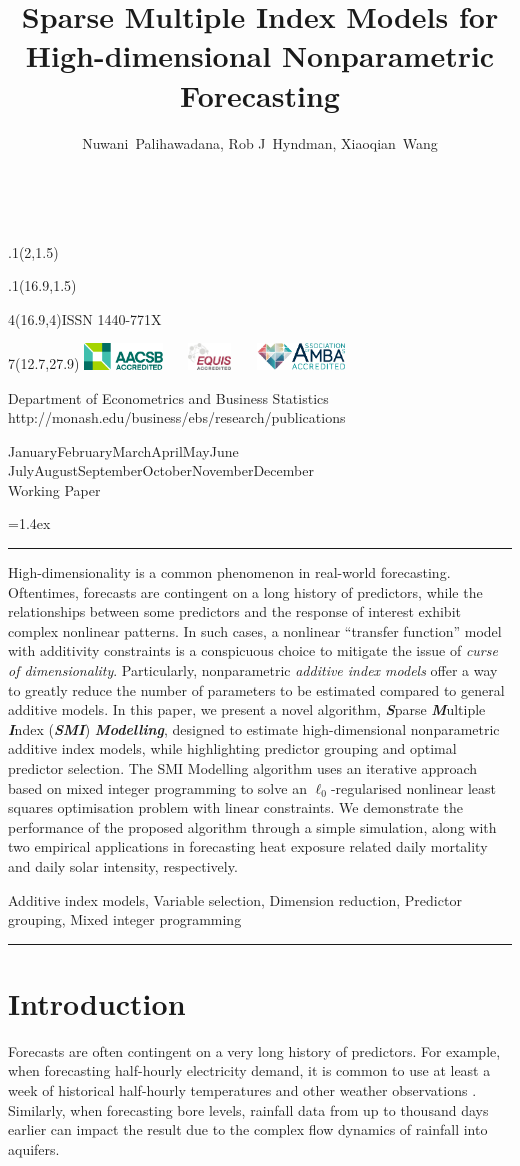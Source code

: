 \documentclass[11pt,a4paper,]{article}
\title{Sparse Multiple Index Models for High-dimensional Nonparametric
Forecasting}
\author{Nuwani~Palihawadana, Rob J~Hyndman, Xiaoqian~Wang}
\date{\sf\Date~\Month~\Year}
\makeatletter
\def\Date{\number\day}
\def\Month{\ifcase\month\or
 January\or February\or March\or April\or May\or June\or
 July\or August\or September\or October\or November\or December\fi}
\def\Year{\number\year}
\def\showjel{{\large\textsf{\textbf{JEL classification:}}~\@jel}}
\def\cover{{\sffamily\setcounter{page}{0}
        \thispagestyle{empty}
        \placefig{2}{1.5}{width=5cm}{_extensions/numbats/wp/monash2}
        \placefig{16.9}{1.5}{width=2.1cm}{_extensions/numbats/wp/MBSportrait}
        \begin{textblock}{4}(16.9,4)ISSN 1440-771X\end{textblock}
        \begin{textblock}{7}(12.7,27.9)\hfill
        \includegraphics[height=0.7cm]{_extensions/numbats/wp/AACSB}~~~
        \includegraphics[height=0.7cm]{_extensions/numbats/wp/EQUIS}~~~
        \includegraphics[height=0.7cm]{_extensions/numbats/wp/AMBA}
        \end{textblock}
        \vspace*{2cm}
        \begin{center}\Large
        Department of Econometrics and Business Statistics\\[.5cm]
        \footnotesize http://monash.edu/business/ebs/research/publications
        \end{center}\vspace{2cm}
        \begin{center}
        \fbox{\parbox{14cm}{\begin{onehalfspace}\centering\Huge\vspace*{0.3cm}
                \textsf{\textbf{\expandafter{\@title}}}\vspace{1cm}\par
                \LARGE\@author\end{onehalfspace}
        }}
        \end{center}
        \vfill
                \begin{center}\Large
                \Month~\Year\\[1cm]
                Working Paper \@wp
        \end{center}\vspace*{2cm}}}
\def\pageone{{\sffamily\setstretch{1}%
        \thispagestyle{empty}%
        \vbox to \textheight{%
        \raggedright\baselineskip=1.2cm
     {\fontsize{24.88}{30}\sffamily\textbf{\expandafter{\@title}}}
        \vspace{2cm}\par
        \hspace{1cm}\parbox{14cm}{\sffamily\large\@addresses}\vspace{1cm}\vfill
        \hspace{1cm}{\large\Date~\Month~\Year}\\[1cm]
        \hspace{1cm}\showjel\vss}}}
\def\blindtitle{{\sffamily
     \thispagestyle{plain}\raggedright\baselineskip=1.2cm
     {\fontsize{24.88}{30}\sffamily\textbf{\expandafter{\@title}}}\vspace{1cm}\par
        }}
\def\titlepage{{\cover\newpage\pageone\newpage\blindtitle}}
\let\maketitle\titlepage
\newenvironment{keywords}{\par\vspace{0.5cm}\noindent{\sffamily\textbf{Keywords:}}}{\vspace{0.25cm}\par\hrule\vspace{0.5cm}\par}
\renewenvironment{abstract}{\begin{minipage}{\textwidth}\parskip=1.4ex\noindent
\hrule\vspace{0.1cm}\par{\sffamily\textbf{\abstractname}}\newline}
  {\end{minipage}}
\def\placefig#1#2#3#4{\begin{textblock}{.1}(#1,#2)\rlap{\texttt{[image: \#4]}}\end{textblock}}
\makeatother
\begin{document}
\maketitle
\begin{abstract}
High-dimensionality is a common phenomenon in real-world forecasting.
Oftentimes, forecasts are contingent on a long history of predictors,
while the relationships between some predictors and the response of
interest exhibit complex nonlinear patterns. In such cases, a nonlinear
``transfer function'' model with additivity constraints is a conspicuous
choice to mitigate the issue of \emph{curse of dimensionality}.
Particularly, nonparametric \emph{additive index models} offer a way to
greatly reduce the number of parameters to be estimated compared to
general additive models. In this paper, we present a novel algorithm,
\textbf{\emph{S}}parse \textbf{\emph{M}}ultiple \textbf{\emph{I}}ndex
(\textbf{\emph{SMI}}) \textbf{\emph{Modelling}}, designed to estimate
high-dimensional nonparametric additive index models, while highlighting
predictor grouping and optimal predictor selection. The SMI Modelling
algorithm uses an iterative approach based on mixed integer programming
to solve an \(\ell_{0}\)-regularised nonlinear least squares
optimisation problem with linear constraints. We demonstrate the
performance of the proposed algorithm through a simple simulation, along
with two empirical applications in forecasting heat exposure related
daily mortality and daily solar intensity, respectively.
\end{abstract}
\begin{keywords}
Additive index models, Variable selection, Dimension reduction,
Predictor grouping, Mixed integer programming
\end{keywords}

\ifdefined\Shaded\renewenvironment{Shaded}{\begin{tcolorbox}[enhanced, frame hidden, boxrule=0pt, sharp corners, breakable, interior hidden, borderline west={3pt}{0pt}{shadecolor}]}{\end{tcolorbox}}\fi

\hypertarget{sec-introduction}{%
\section{Introduction}\label{sec-introduction}}

Forecasts are often contingent on a very long history of predictors. For
example, when forecasting half-hourly electricity demand, it is common
to use at least a week of historical half-hourly temperatures and other
weather observations \autocite{HF2010}. Similarly, when forecasting bore
levels, rainfall data from up to thousand days earlier can impact the
result \autocite{Bakker2019} due to the complex flow dynamics of
rainfall into aquifers.
\end{document}
